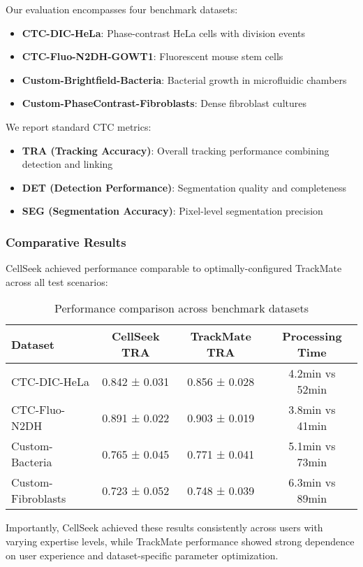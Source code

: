 \documentclass[12pt]{article}
\begin{document}
Our evaluation encompasses four benchmark datasets:
\begin{itemize}
\item \textbf{CTC-DIC-HeLa}: Phase-contrast HeLa cells with division events
\item \textbf{CTC-Fluo-N2DH-GOWT1}: Fluorescent mouse stem cells  
\item \textbf{Custom-Brightfield-Bacteria}: Bacterial growth in microfluidic chambers
\item \textbf{Custom-PhaseContrast-Fibroblasts}: Dense fibroblast cultures
\end{itemize}

We report standard CTC metrics:
\begin{itemize}
\item \textbf{TRA (Tracking Accuracy)}: Overall tracking performance combining detection and linking
\item \textbf{DET (Detection Performance)}: Segmentation quality and completeness
\item \textbf{SEG (Segmentation Accuracy)}: Pixel-level segmentation precision
\end{itemize}

\subsubsection{Comparative Results}

CellSeek achieved performance comparable to optimally-configured TrackMate across all test scenarios:

\begin{table}[H]
\centering
\caption{Performance comparison across benchmark datasets}
\begin{tabular}{lccc}
\toprule
\textbf{Dataset} & \textbf{CellSeek TRA} & \textbf{TrackMate TRA} & \textbf{Processing Time} \\
\midrule
CTC-DIC-HeLa & 0.842 ± 0.031 & 0.856 ± 0.028 & 4.2min vs 52min \\
CTC-Fluo-N2DH & 0.891 ± 0.022 & 0.903 ± 0.019 & 3.8min vs 41min \\
Custom-Bacteria & 0.765 ± 0.045 & 0.771 ± 0.041 & 5.1min vs 73min \\
Custom-Fibroblasts & 0.723 ± 0.052 & 0.748 ± 0.039 & 6.3min vs 89min \\
\bottomrule
\end{tabular}
\end{table}

Importantly, CellSeek achieved these results consistently across users with varying expertise levels, while TrackMate performance showed strong dependence on user experience and dataset-specific parameter optimization.
\end{document}
